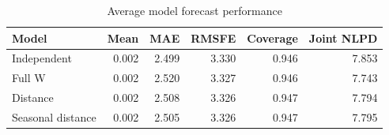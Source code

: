 \documentclass[
  10pt,
]{article}
\begin{document}
\begin{table}

\caption{\label{tab:tbl_perf_avg}Average model forecast performance\label{tbl:perf_avg}}
\centering
\begin{tabular}[t]{lrrrrr}
\toprule
Model & Mean & MAE & RMSFE & Coverage & Joint NLPD\\
\midrule
Independent & 0.002 & 2.499 & 3.330 & 0.946 & 7.853\\
Full W & 0.002 & 2.520 & 3.327 & 0.946 & 7.743\\
Distance & 0.002 & 2.508 & 3.326 & 0.947 & 7.794\\
Seasonal distance & 0.002 & 2.505 & 3.326 & 0.947 & 7.795\\
\bottomrule
\end{tabular}
\end{table}
\end{document}
